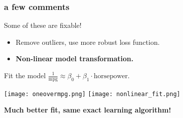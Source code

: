 \documentclass[handout,compress]{beamer}
\begin{document}
\begin{frame}[t]
	\frametitle{a few comments}
	Some of these are fixable!
	\begin{itemize}
		\item Remove outliers, use more robust loss function.
		\item \alert{\textbf{Non-linear model transformation.}}
	\end{itemize}
	Fit the model $\frac{1}{\text{mpg}} \approx \beta_0 + \beta_1\cdot \text{horsepower}$.
	
	\begin{center}
		\texttt{[image: oneovermpg.png]}	\texttt{[image: nonlinear\_fit.png]}
	
	\textbf{Much better fit, same exact learning algorithm!}
	\end{center}
	
\end{frame}
\end{document}
